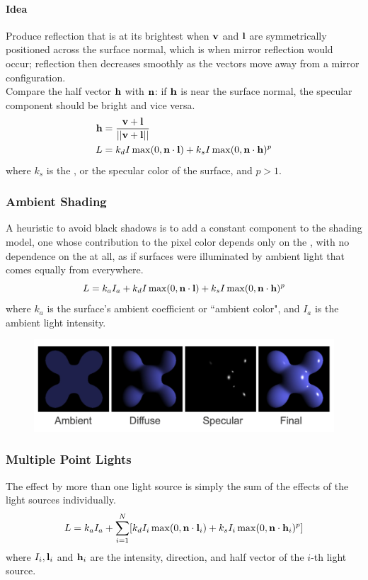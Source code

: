 \documentclass[11pt]{article}
\begin{document}
\paragraph{Idea}
Produce reflection that is at its brightest when $\textbf{v}$ and $\textbf{l}$ are symmetrically positioned across the surface normal, which is when mirror reflection would occur; reflection then decreases smoothly as the vectors move away from a mirror configuration.\\
Compare the half vector $\textbf{h}$ with $\textbf{n}$: if $\textbf{h}$ is near the surface normal, the specular component should be bright and vice versa.
\begin{align*}
	\textbf{h} &= \frac{\textbf{v} + \textbf{l}}{\vert \vert {\textbf{v}+ \textbf{l}} \vert \vert} \\
	L &= k_d I \max(0, \textbf{n} \cdot \textbf{l}) + k_s I \max(0, \textbf{n} \cdot \textbf{h})^p
\end{align*}
where $k_s$ is the , or the specular color of the surface, and $p > 1$.

\subsubsection{Ambient Shading}
A heuristic to avoid black shadows is to add a constant component to the shading model, one whose contribution to the pixel color depends only on the , with no dependence on the  at all, as if surfaces were illuminated by ambient light that comes equally from everywhere.
$$L = k_a I_a + k_d I \max (0, \textbf{n} \cdot \textbf{l}) + k_s I \max (0, \textbf{n} \cdot \textbf{h})^p$$
where $k_a$ is the surface's ambient coefficient or ``ambient color", and $I_a$ is the ambient light intensity.

\begin{figure}[H]
	\centering
	\includegraphics[scale=0.4]{p4}
\end{figure}


\subsubsection{Multiple Point Lights}
\property[superposition]
The effect by more than one light source is simply the sum of the effects of the light sources individually.
$$L = k_a I_a + \sum_{i=1}^N[k_dI_i\max(0, \textbf{n} \cdot \textbf{l}_i) + k_sI_i \max(0, \textbf{n} \cdot \textbf{h}_i)^p]$$
where $I_i, \textbf{l}_i$ and $\textbf{h}_i$ are the intensity, direction, and half vector of the $i$-th light source.
\end{document}
